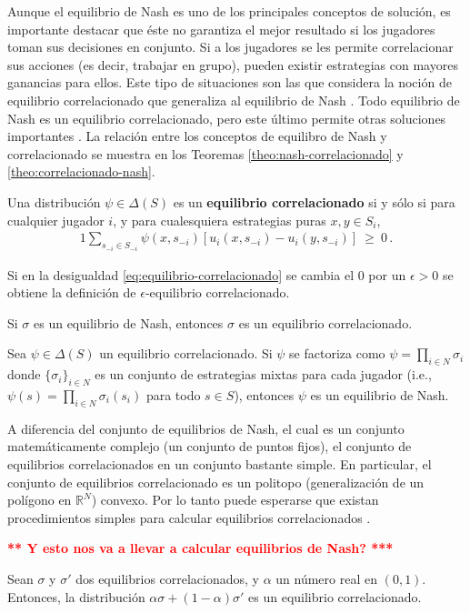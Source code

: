 Aunque el equilibrio de Nash es uno de los principales conceptos de solución, es importante destacar que éste no garantiza el mejor resultado si los jugadores toman sus decisiones en conjunto. Si a los jugadores se les permite correlacionar sus acciones (es decir, trabajar en grupo), pueden existir estrategias con mayores ganancias para ellos. 
Este tipo de situaciones son las que considera la noción de equilibrio correlacionado que generaliza al equilibrio de Nash \cite{bib:correlated-equilibrium}. Todo equilibrio de Nash es un equilibrio correlacionado, pero este último permite otras soluciones importantes \cite{bib:correlated-equilibrium}. La relación entre los conceptos de equilibro de Nash y correlacionado se muestra en los Teoremas \ref{theo:nash-correlacionado} y \ref{theo:correlacionado-nash}.

\begin{definition}
\label{def:equilibrio-correlacionado}
Una distribución $\psi\in\Delta(S)$ es un \textbf{equilibrio correlacionado} si y sólo si para cualquier jugador $i$, y para cualesquiera estrategias puras $x, y \in S_i$,
\begin{alignat}{1}
\label{eq:equilibrio-correlacionado}
\sum_{s_{-i}\in S_{-i}} \psi(x,s_{-i}) [ u_i(x,s_{-i}) - u_i(y,s_{-i})]\ \geq\ 0 \,.
\end{alignat}
\end{definition}

Si en la desigualdad \eqref{eq:equilibrio-correlacionado} se cambia el $0$ por un $\epsilon > 0$ se obtiene la definición de $\epsilon$-equilibrio correlacionado.


\begin{theorem}
\label{theo:nash-correlacionado}
Si $\sigma$ es un equilibrio de Nash, entonces $\sigma$ es un equilibrio correlacionado.
\end{theorem}

\begin{theorem}
\label{theo:correlacionado-nash}
Sea $\psi\in\Delta(S)$ un equilibrio correlacionado. Si $\psi$ se factoriza como $\psi=\prod_{i\in N} \sigma_i$ donde $\{\sigma_i\}_{i\in N}$ es un conjunto de estrategias mixtas para cada jugador (i.e., $\psi(s)=\prod_{i \in N} \sigma_i(s_i)$ para todo $s\in S$), entonces $\psi$ es un equilibrio de Nash.
\end{theorem}

A diferencia del conjunto de equilibrios de Nash, el cual es un conjunto matemáticamente complejo (un conjunto de puntos fijos), el conjunto de equilibrios correlacionados en un conjunto bastante simple. En particular, el conjunto de equilibrios correlacionado es un politopo (generalización de un polígono en $\mathbb{R}^N$) convexo. Por lo tanto puede esperarse que existan procedimientos simples para calcular equilibrios correlacionados \cite{bib:correlated-equilibrium}.

\noindent\textcolor{red}{\bf *** Y esto nos va a llevar a calcular equilibrios de Nash? ***}

\begin{theorem}
Sean $\sigma$ y $\sigma'$ dos equilibrios correlacionados, y $\alpha$ un número real en $(0,1)$. Entonces, la distribución $\alpha\sigma + (1-\alpha)\sigma'$ es un equilibrio correlacionado.
\end{theorem}
